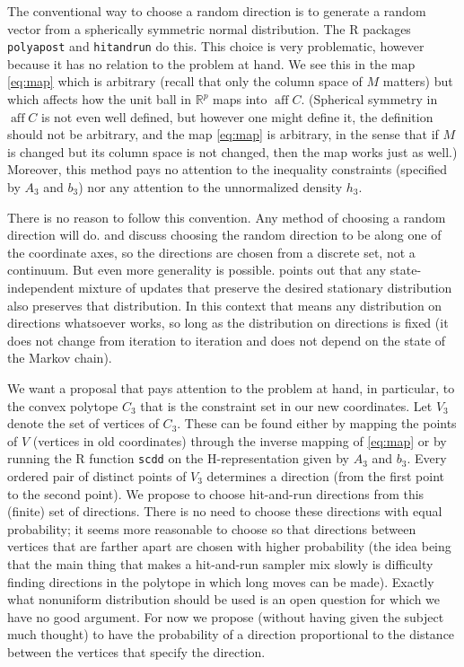 \documentclass[11pt]{article}
\DeclareMathOperator{\aff}{aff}
\newcommand{\real}{\mathbb{R}}
\begin{document}
The conventional way to choose a random direction is to generate
a random vector from a spherically symmetric normal distribution.
The R packages \texttt{polyapost} and \texttt{hitandrun} do this.
This choice is very problematic, however because it has no relation
to the problem at hand.  We see this in the map \eqref{eq:map} which
is arbitrary (recall that only the column space of $M$ matters) but
which affects how the unit ball in $\real^p$ maps into $\aff C$.
(Spherical symmetry in $\aff C$ is not
even well defined, but however one might define it, the definition
should not be arbitrary, and the map \eqref{eq:map} is arbitrary,
in the sense that if $M$ is changed but its column space is not changed,
then the map works just as well.)
Moreover, this method pays no attention
to the inequality constraints (specified by $A_3$ and $b_3$) nor any
attention to the unnormalized density $h_3$.

There is no reason to follow this convention.  Any method of choosing
a random direction will do.  \citet{smith} and \citet{hit-run-one}
discuss choosing the random direction to be along one of the coordinate axes,
so the directions are chosen from a discrete set, not a continuum.
But even more generality is possible.
\citet[Section~1.12.8]{geyer-intro} points out
that any state-independent mixture of updates that preserve the desired
stationary distribution also preserves that distribution.  In this context
that means any distribution on directions whatsoever works, so long as the
distribution on directions is fixed (it does not change from iteration
to iteration and does not depend on the state of the Markov chain).

We want a proposal that pays attention to the problem at hand, in particular,
to the convex polytope $C_3$ that is the constraint set in our new coordinates.
Let $V_3$ denote the set of vertices of $C_3$.  These can be found either
by mapping the points of $V$ (vertices in old coordinates) through the
inverse mapping of \eqref{eq:map} or by running the R function \texttt{scdd}
on the H-representation given by $A_3$ and $b_3$.  Every ordered pair of
distinct points of $V_3$ determines a direction (from the first point to the
second point).  We propose to choose hit-and-run directions from this
(finite) set of directions.  There is no need to choose these directions
with equal probability; it seems more reasonable to choose so that directions
between vertices that are farther apart are chosen with higher probability
(the idea being that the main thing that makes a hit-and-run sampler mix
slowly is difficulty finding directions in the polytope in which long moves
can be made).  Exactly what nonuniform distribution should be used is an
open question for which we have no good argument.  For now we propose
(without having given the subject much thought) to have the probability
of a direction proportional to the distance between the vertices that
specify the direction.
\end{document}
